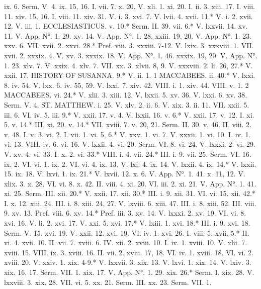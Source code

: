 ix. 6.	Serm. V. 4.
ix. 15, 16.	I. vii. 7.
x. 20.	V. xli. 1.
xi. 20.	I. ii. 3.
xiii. 17.	I. viii. 11.
xiv. 15, 16.	I. viii. 11.
xiv. 31.	V. i. 3.
xvi. 7.	V. lvii. 4.
xvii. 11.*	V. i. 2.
xvii. 12.	V. iii. 1.
ECCLESIASTICUS.
v. 10.*	Serm. II. 39.
vii. 6.*	V. lxxvii. 14.
xv. 11.	V. App. N°. 1. 29.
xv. 14.	V. App. N°. 1. 28.
xxiii. 19, 20.	V. App. N°. 1. 23.
xxv. 6.	VII. xvii. 2.
xxvi. 28.*	Pref. viii. 3.
xxxiii. 7-12.	V. lxix. 3.
xxxviii. 1.	VII. xvii. 2.
xxxix. 4.	V. xv. 3.
xxxix. 18.	V. App. N°. 1. 46.
xxxix. 19, 20.	V. App. N°. 1. 23.
xlv. 7.	V. xxix. 4.
xlv. 7.	VII. xx. 3.
xlvii. 8, 9.	V. xxxviii. 2.
li. 26, 27.*	V. xxii. 17.
HISTORY OF SUSANNA.
9.*	V. ii. 1.
1 MACCABEES.
ii. 40.*	V. lxxi. 8.
iv. 54.	V. lxx. 6.
iv. 55, 59.	V. lxxi. 7.
xiv. 42.	VIII. i. 1.
xiv. 44.	VIII. v. 1.
2 MACCABEES.
vi. 24.*	V. xlii. 3.
xiii. 12.	V. lxxii. 5.
xv. 36.	V. lxxi. 6.
xv. 38.	Serm. V. 4.
ST. MATTHEW.
i. 25.	V. xlv. 2.
ii. 6.	V. xix. 3.
ii. 11.	VII. xxii. 5.
iii. 6.	VI. iv. 5.
iii. 9.*	V. xxii. 17.
v. 4.	V. lxxii. 16.
v. 6.*	V. xxii. 17.
v. 12.	I. xi. 5.
v. 14.*	III. xi. 20.
v. 14.*	VII. xviii. 7.
v. 20, 21.	Serm. II. 30.
v. 46.	II. viii. 2.
v. 48.	I. v. 3.
vi. 2.	I. vii. 1.
vi. 5, 6.*	V. xxv. 1.
vi. 7.	V. xxxii. 1.
vi. 10.	I. iv. 1.
vi. 13.	VIII. iv. 6.
vi. 16.	V. lxxii. 4.
vi. 20.	Serm. VI. 8.
vi. 24.	V. lxxxi. 2.
vi. 29.	V. xv. 4.
vi. 33.	I. x. 2.
vi. 33.*	VIII. i. 4.
vii. 24.*	III. i. 9.
vii. 25.	Serm. VI. 16.
ix. 2.	VI. vi. 1.
ix. 2.	VI. vi. 4.
ix. 13.	V. lxi. 4.
ix. 14.	V. lxxii. 4.
ix. 14.*	V. lxxii. 15.
ix. 18.	V. lxvi. 1.
ix. 21.*	V. lxvii. 12.
x. 6.	V. App. N°. 1. 41.
x. 11, 12.	V. xlix. 3.
x. 28.	VI. vi. 8.
x. 42.	II. viii. 4.
xi. 20.	VI. iii. 2.
xi. 21.	V. App. N°. 1. 41.
xi. 25.	Serm. III.
xii. 20.*	V. xxii. 17.
xii. 30.*	III. i. 9.
xii. 31.	VI. vi. 15.
xii. 42.*	I. x. 12.
xiii. 24.	III. i. 8.
xiii. 24, 27.	V. lxviii. 6.
xiii. 47.	III. i. 8.
xiii. 52.	III. viii. 9.
xv. 13.	Pref. viii. 6.
xv. 14.*	Pref. iii. 3.
xv. 14.	V. lxxxi. 2.
xv. 19.	VI. vi. 8.
xvi. 16.	V. li. 2.
xvi. 17.	V. xxi. 5.
xvi. 17.*	V. lxiii. 1.
xvi. 18.*	III. i. 9.
xvi. 18.	Serm. V. 15.
xvi. 19.	V. xxii. 12.
xvi. 19.	VI. iv. 1.
xvi. 26.	I. viii. 5.
xvii. 5.*	II. vi. 4.
xvii. 10.	II. vii. 7.
xviii. 6.	IV. xii. 2.
xviii. 10.	I. iv. 1.
xviii. 10.	V. xlii. 7.
xviii. 15.	VIII. ix. 3.
xviii. 16.	II. vii. 2.
xviii. 17, 18.	VI. iv. 1.
xviii. 18.	VI. vi. 2.
xviii. 20.	V. xxiv. 1.
xix. 4-9.*	V. lxxvii. 3.
xix. 13.	V. lxvi. 1.
xix. 14.	V. lxiv. 3.
xix. 16, 17.	Serm. VII. 1.
xix. 17.	V. App. N°. 1. 29.
xix. 26.*	Serm. I.
xix. 28.	V. lxxviii. 3.
xix. 28.	VII. vi. 5.
xx. 21.	Serm. III.
xx. 23.	Serm. VII. 1.
